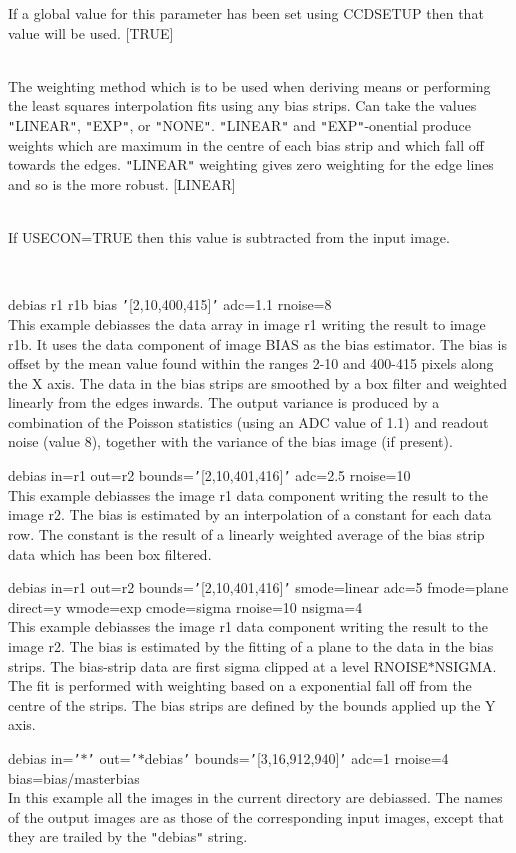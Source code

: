 \documentclass[twoside,11pt]{article}
\renewcommand{\_}{\texttt{\symbol{95}}}
\newcommand{\qt}[1]{{\tt "}#1{\tt "}}
\newcommand{\qs}[1]{{\tt '}#1{\tt '}}
\newcommand{\sstexamples}[1]{
   \item[Examples:] \mbox{} \\
   \vspace{-3.5ex}
   \begin{description}
      #1
   \end{description}
}
\newcommand{\sstsubsection}[1]{ \item[{#1}] \mbox{} \\}
\newcommand{\sstexamplesubsection}[2]{\sloppy \item{\ssttt #1} \mbox{} \\ #2 }
\newcommand{\sstnotes}[1]{\item[Notes:] \mbox{} \\[1.3ex] #1}
\newcommand{\sstitemlist}[1]{
  \mbox{} \\
  \vspace{-3.5ex}
  \begin{itemize}
     #1
  \end{itemize}
}
\newcommand{\sstexamples}[1]{
      \item[Examples:] \\
      \begin{description}
         #1
      \end{description}
      \\
   }
\newcommand{\sstsubsection}[1]{\item[{#1}]}
\newcommand{\sstexamplesubsection}[2]{\item[{\ssttt #1}] #2}
\newcommand{\sstnotes}[1]{\item[Notes:] #1 }
\newcommand{\sstitemlist}[1]{
      \begin{itemize}
         #1
      \end{itemize}
      \\
   }
\begin{document}
{{{         If a global value for this parameter has been set using 
         CCDSETUP then that value will be used.
         [TRUE]
      }
      \sstsubsection{
         WMODE = LITERAL (Read)
      } {
         The weighting method which is to be used when deriving means
         or performing the least squares interpolation fits using any
         bias strips. Can take the values \qt{LINEAR}, \qt{EXP}, or \qt{NONE}.
         \qt{LINEAR} and \qt{EXP}-onential produce weights which are maximum
         in the centre of each bias strip and which fall off towards
         the edges. \qt{LINEAR} weighting gives zero weighting for the
         edge lines and so is the more robust.
         [LINEAR]
      }
      \sstsubsection{
         ZERO = \_DOUBLE (Read)
      } {
         If USECON=TRUE then this value is subtracted from the input
         image.
      }
   }
\newpage
   \sstexamples{
      \sstexamplesubsection{
         debias r1 r1b bias \qs{[2,10,400,415]} adc=1.1 rnoise=8
      } {
         This example debiasses the data array in image r1 writing the
         result to image r1b. It uses the data component of image BIAS as
         the bias estimator. The bias is offset by the mean value found
         within the ranges 2-10 and 400-415 pixels along the X axis.
         The data in the bias strips are smoothed by a box filter and
         weighted linearly from the edges inwards. The output variance
         is produced by a combination of the Poisson statistics (using
         an ADC value of 1.1) and readout noise (value 8), together
         with the variance of the bias image (if present).
      }
      \sstexamplesubsection{
         debias in=r1 out=r2 bounds=\qs{[2,10,401,416]} adc=2.5 rnoise=10
      } {
         This example debiasses the image r1 data component writing the
         result to the image r2. The bias is estimated by an interpolation
         of a constant for each data row. The constant is the result of
         a linearly weighted average of the bias strip data which has
         been box filtered.
      }
      \sstexamplesubsection{
         debias in=r1 out=r2 bounds=\qs{[2,10,401,416]} smode=linear adc=5
             fmode=plane direct=y wmode=exp cmode=sigma rnoise=10
             nsigma=4
      } {
         This example debiasses the image r1 data component writing the
         result to the image r2. The bias is estimated by the fitting of a
         plane to the data in the bias strips. The bias-strip data are
         first sigma clipped at a level RNOISE$*$NSIGMA. The fit is
         performed with weighting based on a exponential fall off
         from the centre of the strips. The bias strips are defined by
         the bounds applied up the Y axis.
      }
      \sstexamplesubsection{
         debias in=\qs{$*$} out=\qs{$*$\_debias}
             bounds=\qs{[3,16,912,940]} adc=1 rnoise=4
             bias=bias/master\_bias
      } {
         In this example all the images in the current directory are
         debiassed. The names of the output images are as those of the
         corresponding input images, except that they are trailed by the
         \qt{\_debias} string.
      }
   }
   \sstnotes{
      \sstitemlist{

}}}
\end{document}
